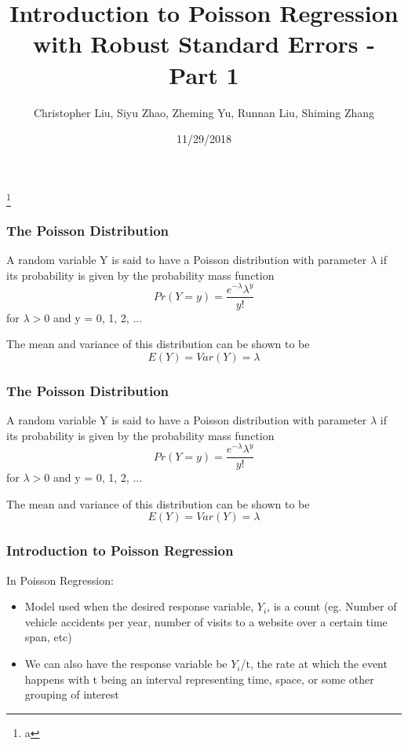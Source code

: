 \documentclass{beamer}
\title{Introduction to Poisson Regression with Robust Standard Errors - Part 1}
\author{Christopher Liu, Siyu Zhao, Zheming Yu, Runnan Liu, Shiming Zhang}
\institute{San Diego State University, Stats 610}
\date{11/29/2018}
\begin{document}
	

\begin{frame}[plain]

	\titlepage
	
	\footnote{a}

\end{frame}



\begin{frame}[fragile]\frametitle{The Poisson Distribution}

	A random variable Y is said to have a Poisson distribution with parameter $\lambda$ if its probability is given by the probability mass function
	$$ Pr(Y = y) = \frac{e^{-\lambda}\lambda^{y}}{y!} $$
	for $\lambda > 0$ and y = 0, 1, 2, ... 
 
	The mean and variance of this distribution can be shown to be
	$$ E(Y) = Var(Y) = \lambda $$ 

\end{frame}



\begin{frame}[fragile]\frametitle{The Poisson Distribution}

	A random variable Y is said to have a Poisson distribution with parameter $\lambda$ if its probability is given by the probability mass function
	$$ Pr(Y = y) = \frac{e^{-\lambda}\lambda^{y}}{y!} $$
	for $\lambda > 0$ and y = 0, 1, 2, ... 
 
	The mean and variance of this distribution can be shown to be
	$$ E(Y) = Var(Y) = \lambda $$ 

\end{frame}



\begin{frame}[fragile]\frametitle{Introduction to Poisson Regression}
	In Poisson Regression:
	
	\begin{itemize}
	
		\item Model used when the desired response variable, $Y_{i}$, is a count (eg. Number of vehicle accidents per year, number of visits to a website over a certain time span, etc)
		\item We can also have the response variable be $Y_{i}$/t, the rate at which the event happens with t being an interval representing time, space, or some other grouping of interest

	\end{itemize}

\end{frame}
\end{document}
